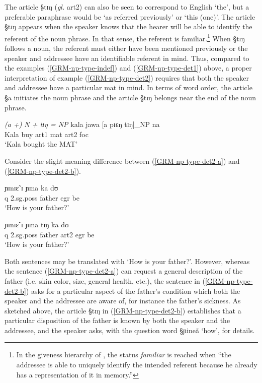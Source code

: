 The article {\S tɪŋ}  ({\it gl.} {\sc art2}) can also be seen to correspond to
English `the',  but a preferable paraphrase would be `as referred previously' or
 `this (one)'.  The article {\S  tɪŋ} appears when the speaker knows that the
hearer will be able to identify the referent of the noun phrase. In that sense,
the referent is familiar.\footnote{In the giveness hierarchy of
\citet[278]{Gund93}, the status {\it familiar} is reached when ``the addressee
is able to uniquely identify the intended referent because he already has a
representation of it in memory.''}   When {\S tɪŋ} follows a noun, the referent
must either have been mentioned previously or the speaker and addressee have an
identifiable referent in mind. Thus, compared to the examples
(\ref{GRM-np-type-indef}) and (\ref{GRM-np-type-det1}) above, a proper
interpretation of example (\ref{GRM-np-type-det2}) requires that both the
speaker and addressee have a particular mat in mind. In terms of word order, the
article  {\S a}  initiates the noun phrase and  the article {\S tɪŋ}  belongs
near the end of the noun phrase. 
 

\begin{exe}
 \ex\label{GRM-np-type-det2}{\it   (a +) N + tɪŋ = NP}
\gll  kala jawa  [a pɪɛŋ  tɪŋ]_{NP} na\\
     Kala buy {\sc art1}  mat {\sc art2} {\sc foc}\\
\glt  `Kala bought the MAT'
\end{exe}

Consider the slight meaning difference between
(\ref{GRM-np-type-det2-a}) and (\ref{GRM-np-type-det2-b}).


\begin{exe}
 \ex\label{GRM-np-type-det2-ab}
 \begin{xlist}
  \ex\label{GRM-np-type-det2-a}
\gll ɲɪnɪɛ̃ ɪ ɲɪna ka dʊ\\
    {\sc q} {\sc 2.sg.poss} father {\sc  egr} be  \\
\glt  `How is your father?'

  \ex\label{GRM-np-type-det2-b}
\gll ɲɪnɪɛ̃ ɪ ɲɪna tɪŋ ka dʊ \\
   {\sc q} {\sc 2.sg.poss} father {\sc art2} {\sc  egr} be \\
\glt  `How is your father?'
  
 \end{xlist}
\end{exe}


Both sentences may be translated with `How is your father?'. However, whereas 
the sentence (\ref{GRM-np-type-det2-a}) can request  a general description
of the father (i.e. skin color, size, general health, etc.), the sentence
in (\ref{GRM-np-type-det2-b}) asks for a particular aspect of the
father's condition which both the speaker and the addressee are aware of, for
instance the father's sickness. As sketched above, the article {\S tɪŋ}  in
(\ref{GRM-np-type-det2-b}) establishes that a particular disposition of the
father is known  by both the speaker and the addressee,  and the speaker
asks, with the question word {\S ɲineã} `how',   for details. 

